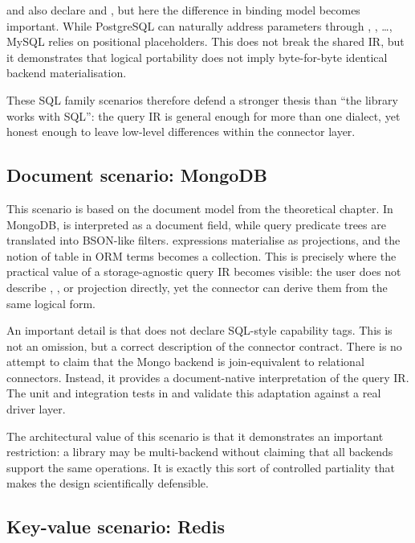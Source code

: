  and  also declare  and , but here the difference in binding model becomes important. While PostgreSQL can naturally address parameters through , , \ldots{}, MySQL relies on positional  placeholders. This does not break the shared IR, but it demonstrates that logical portability does not imply byte-for-byte identical backend materialisation.

These SQL family scenarios therefore defend a stronger thesis than ``the library works with SQL'': the query IR is general enough for more than one dialect, yet honest enough to leave low-level differences within the connector layer.

\subsection{Document scenario: MongoDB}

This scenario is based on the document model from the theoretical chapter. In MongoDB,  is interpreted as a document field, while query predicate trees are translated into BSON-like filters.  expressions materialise as projections, and the notion of table in ORM terms becomes a collection. This is precisely where the practical value of a storage-agnostic query IR becomes visible: the user does not describe , , or projection directly, yet the connector can derive them from the same logical form.

An important detail is that  does not declare SQL-style capability tags. This is not an omission, but a correct description of the connector contract. There is no attempt to claim that the Mongo backend is join-equivalent to relational connectors. Instead, it provides a document-native interpretation of the query IR. The unit and integration tests in  and  validate this adaptation against a real driver layer.

The architectural value of this scenario is that it demonstrates an important restriction: a library may be multi-backend without claiming that all backends support the same operations. It is exactly this sort of controlled partiality that makes the design scientifically defensible.

\subsection{Key-value scenario: Redis}


